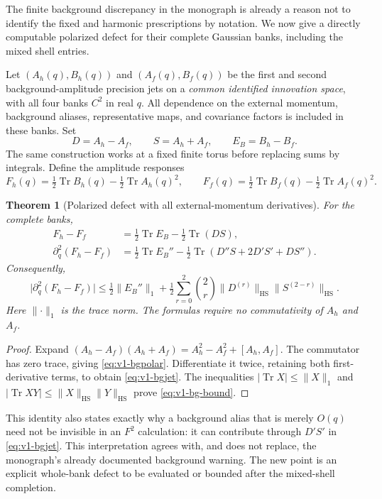 \documentclass[11pt,a4paper]{article}
\newtheorem{theorem}{Theorem}[section]
\theoremstyle{definition}
\theoremstyle{remark}
\DeclareMathOperator{\Tr}{Tr}
\newcommand{\norm}[1]{\lVert #1\rVert}
\newcommand{\abs}[1]{\lvert #1\rvert}
\newcommand{\HS}{\mathrm{HS}}
\begin{document}
The finite background discrepancy in the monograph is already a reason
not to identify the fixed and harmonic prescriptions by notation. We
now give a directly computable polarized defect for their complete
Gaussian banks, including the mixed shell entries.

Let $(A_h(q),B_h(q))$ and $(A_f(q),B_f(q))$ be the first and second
background-amplitude precision jets on a \emph{common identified
innovation space}, with all four banks $C^2$ in real $q$. All dependence on the external momentum, background
aliases, representative maps, and covariance factors is included in
these banks. Set
\begin{equation}\label{eq:v1-background-vars}
 D=A_h-A_f,\qquad S=A_h+A_f,\qquad E_B=B_h-B_f.
\end{equation}
The same construction works at a fixed finite torus before replacing
sums by integrals. Define the amplitude responses
\[
 F_h(q)=\tfrac12\Tr B_h(q)-\tfrac12\Tr A_h(q)^2,
 \qquad F_f(q)=\tfrac12\Tr B_f(q)-\tfrac12\Tr A_f(q)^2.
\]

\begin{theorem}[Polarized defect with all external-momentum derivatives]
\label{thm:v1-background}
For the complete banks,
\begin{align}
 F_h-F_f&=\tfrac12\Tr E_B-\tfrac12\Tr(DS),
                                          \label{eq:v1-bgpolar}\\
 \partial_q^2(F_h-F_f)
   &=\tfrac12\Tr E_B''
       -\tfrac12\Tr(D''S+2D'S'+DS'').
                                          \label{eq:v1-bgjet}
\end{align}
Consequently,
\begin{equation}\label{eq:v1-bg-bound}
 \abs{\partial_q^2(F_h-F_f)}
 \le\tfrac12\norm{E_B''}_1
    +\tfrac12\sum_{r=0}^2\binom2r
                    \norm{D^{(r)}}_\HS\norm{S^{(2-r)}}_\HS.
\end{equation}
Here $\norm{\cdot}_1$ is the trace norm. The formulas require no
commutativity of $A_h$ and $A_f$.
\end{theorem}
\begin{proof}
Expand
$(A_h-A_f)(A_h+A_f)=A_h^2-A_f^2+[A_h,A_f]$.
The commutator has zero trace, giving \cref{eq:v1-bgpolar}. Differentiate
it twice, retaining both first-derivative terms, to obtain
\cref{eq:v1-bgjet}. The inequalities
$|\Tr X|\le\norm X_1$ and
$|\Tr XY|\le\norm X_\HS\norm Y_\HS$ prove
\cref{eq:v1-bg-bound}.
\end{proof}

This identity also states exactly why a background alias that is merely
$O(q)$ need not be invisible in an $F^2$ calculation: it can contribute
through $D'S'$ in \cref{eq:v1-bgjet}. This interpretation agrees with,
and does not replace, the monograph's already documented background
warning. The new point is an explicit whole-bank defect to be evaluated
or bounded after the mixed-shell completion.
\end{document}
